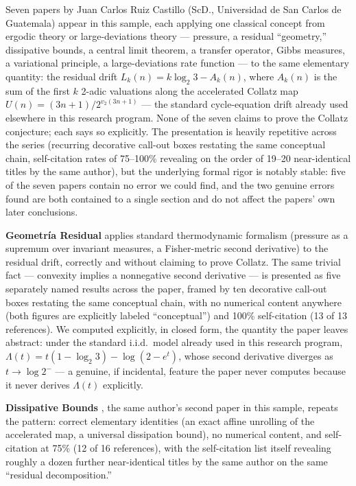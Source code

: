 \documentclass[11pt]{article}
\begin{document}
Seven papers by Juan Carlos Ruiz Castillo (ScD., Universidad de San
Carlos de Guatemala) appear in this sample, each applying one classical
concept from ergodic theory or large-deviations theory --- pressure,
a residual ``geometry,'' dissipative bounds, a central limit theorem,
a transfer operator, Gibbs measures, a variational principle, a
large-deviations rate function --- to the same elementary quantity:
the residual drift $L_k(n) = k\log_2 3 - A_k(n)$, where $A_k(n)$ is the
sum of the first $k$ 2-adic valuations along the accelerated Collatz
map $U(n) = (3n+1)/2^{v_2(3n+1)}$ --- the standard cycle-equation drift
already used elsewhere in this research program. None of the seven
claims to prove the Collatz conjecture; each says so explicitly. The
presentation is heavily repetitive across the series (recurring
decorative call-out boxes restating the same conceptual chain,
self-citation rates of 75--100\% revealing on the order of 19--20
near-identical titles by the same author), but the underlying formal
rigor is notably stable: five of the seven papers contain no error we
could find, and the two genuine errors found are both contained to a
single section and do not affect the papers' own later conclusions.

\textbf{Geometría Residual} \cite{RuizCastillo2026a} applies standard
thermodynamic formalism (pressure as a supremum over invariant
measures, a Fisher-metric second derivative) to the residual drift,
correctly and without claiming to prove Collatz. The same trivial fact
--- convexity implies a nonnegative second derivative --- is presented
as five separately named results across the paper, framed by ten
decorative call-out boxes restating the same conceptual chain, with no
numerical content anywhere (both figures are explicitly labeled
``conceptual'') and 100\% self-citation (13 of 13 references). We
computed explicitly, in closed form, the quantity the paper leaves
abstract: under the standard i.i.d.\ model already used in this
research program, $\Lambda(t) = t(1-\log_2 3) - \log(2-e^t)$, whose
second derivative diverges as $t \to \log 2^-$ --- a genuine, if
incidental, feature the paper never computes because it never derives
$\Lambda(t)$ explicitly.

\textbf{Dissipative Bounds} \cite{RuizCastillo2026b}, the same author's
second paper in this sample, repeats the pattern: correct elementary
identities (an exact affine unrolling of the accelerated map, a
universal dissipation bound), no numerical content, and self-citation
at 75\% (12 of 16 references), with the self-citation list itself
revealing roughly a dozen further near-identical titles by the same
author on the same ``residual decomposition.''
\end{document}
